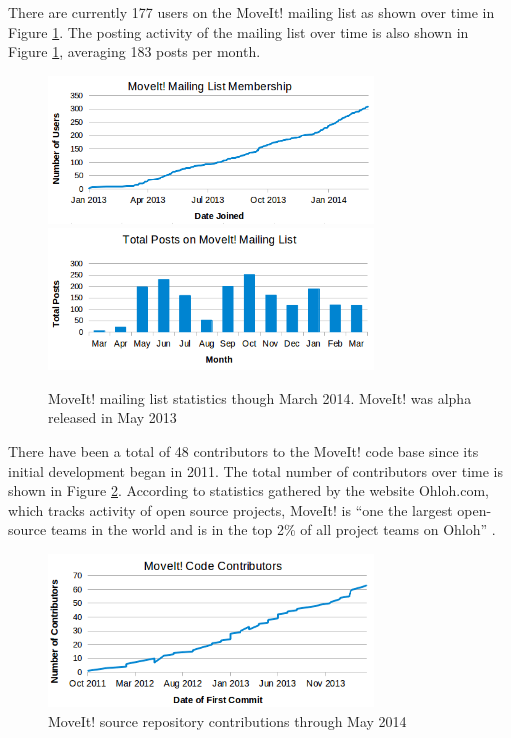 \documentclass[10pt,journal,compsoc]{joser1}
\begin{document}
{There are currently 177 users on the MoveIt! mailing list as shown over time in
Figure \ref{fig:membership_plot}. The posting activity of the mailing list over
time is also shown in Figure \ref{fig:membership_plot}, averaging 183 posts per
month.

\begin{figure}[!t]
\centering
\includegraphics[width=3.4in]{coleman_20131110_f11}
\includegraphics[width=3.4in]{coleman_20131110_f12}
\caption{MoveIt! mailing list statistics though March 2014. MoveIt! was alpha released in May 2013}
\label{fig:membership_plot}
\end{figure}

There have been a total of 48 contributors to the MoveIt! code base since its
initial development began in 2011. The total number of contributors over time is
shown in Figure \ref{fig:contributors}. According to statistics gathered by the
website Ohloh.com, which tracks activity of open source projects, MoveIt! is
``one the largest open-source teams in the world and is in the top 2\% of all
project teams on Ohloh'' \cite{ohloh}.

\begin{figure}[!t]
\centering
\includegraphics[width=3.4in]{coleman_20131110_f13}
\caption{MoveIt! source repository contributions through May 2014}
\label{fig:contributors}
\end{figure}

}
\end{document}

